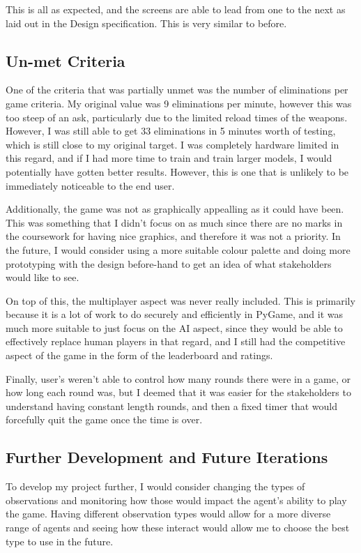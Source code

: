This is all as expected, and the screens are able to lead from one to the next as laid out in the Design specification. This is very similar to before.


\subsection{Un-met Criteria}

One of the criteria that was partially unmet was the number of eliminations per game criteria. My original value was 9 eliminations per minute, however this was too steep of an ask, particularly due to the limited reload times of the weapons. However, I was still able to get 33 eliminations in 5 minutes worth of testing, which is still close to my original target. I was completely hardware limited in this regard, and if I had more time to train and train larger models, I would potentially have gotten better results. However, this is one that is unlikely to be immediately noticeable to the end user.

\vs
Additionally, the game was not as graphically appealling as it could have been. This was something that I didn't focus on as much since there are no marks in the coursework for having nice graphics, and therefore it was not a priority. In the future, I would consider using a more suitable colour palette and doing more prototyping with the design before-hand to get an idea of what stakeholders would like to see.

\vs
On top of this, the multiplayer aspect was never really included. This is primarily because it is a lot of work to do securely and efficiently in PyGame, and it was much more suitable to just focus on the AI aspect, since they would be able to effectively replace human players in that regard, and I still had the competitive aspect of the game in the form of the leaderboard and ratings.

\vs
Finally, user's weren't able to control how many rounds there were in a game, or how long each round was, but I deemed that it was easier for the stakeholders to understand having constant length rounds, and then a fixed timer that would forcefully quit the game once the time is over.

\subsection{Further Development and Future Iterations}

To develop my project further, I would consider changing the types of observations and monitoring how those would impact the agent's ability to play the game. Having different observation types would allow for a more diverse range of agents and seeing how these interact would allow me to choose the best type to use in the future.

